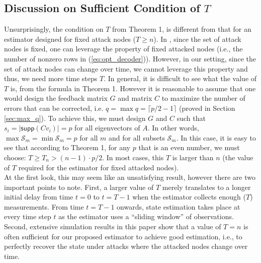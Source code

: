 \documentclass[twocolumn]{autart}    %
\newcommand{\rev}[1]{{\normalsize{{{\color{blue}#1}}}}}
\begin{document}
\subsection{Discussion on Sufficient Condition of $T$}
\vspace{-0.4cm}
Unsurprisingly, the condition on $T$ from Theorem 1, is different from that for an \rev{estimator} designed for fixed attack nodes ($T\geq n$). In \cite{Fawzi2014}, since the set of attack nodes is fixed, one can leverage the property of fixed attacked nodes (i.e., the number of nonzero rows in (\ref{eq:opt_decoder})). However, in our setting, since the set of attack nodes can change over time, we cannot leverage this property and thus, we need more time steps $T$.
In general, it is difficult to see what the value of $T$ is, from the formula in Theorem 1. However it is reasonable to assume that one would design the feedback matrix $G$ and matrix $C$ to maximize the number of errors that can be corrected, i.e. $q = \max q = \lceil p/2 - 1 \rceil$ (proved in Section \ref{sec:max_q}). To achieve this, we must design $G$ and $C$ such that $s_i = \lvert \textsf{supp} (C v_i) \rvert = p$ for all eigenvectors of $A$. In other words, $\operatorname{max} \mathcal{S}_m = \operatorname{min} \mathcal{S}_m = p$ for all $m$ and for all subsets $\mathcal{S}_m$. 
In this case, it is easy to see that according to Theorem 1, for any $p$ that is an even number, we must choose: $T\geq T_n > (n-1) \cdot p/2$.
In most cases, this $T$ is larger than $n$ (the value of $T$ required for the \rev{estimator} for fixed attacked nodes).
\\
At the first look, this may seem like an unsatisfying result, however there are two important points to note. First, a larger value of $T$ merely translates to a longer initial delay from time $t = 0$ to $t=T-1$ when the \rev{estimator} collects enough ($T$) measurements. From time $t=T-1$ onwards, \rev{state estimation takes place at every time step $t$ as the \rev{estimator} uses a ``sliding window'' of observations}. Second, extensive simulation results in this paper show that a value of $T = n$ is often sufficient for our proposed \rev{estimator} to achieve good estimation, i.e., to perfectly recover the state under attacks where the attacked nodes change over time. 
\end{document}

